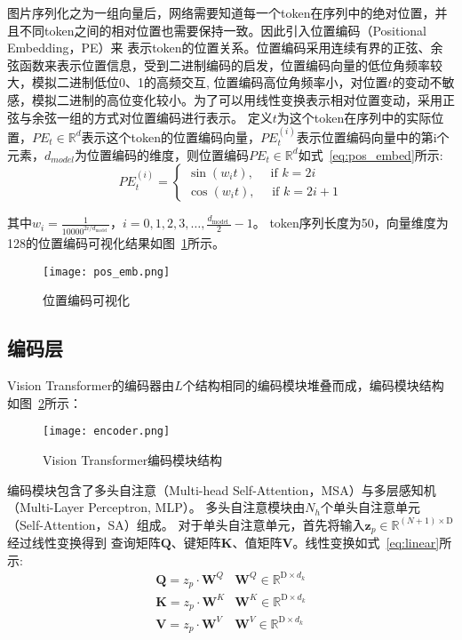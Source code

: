 图片序列化之为一组向量后，网络需要知道每一个token在序列中的绝对位置，并且不同token之间的相对位置也需要保持一致。因此引入位置编码（Positional Embedding，PE）来
表示token的位置关系。位置编码采用连续有界的正弦、余弦函数来表示位置信息，受到二进制编码的启发，位置编码向量的低位角频率较大，模拟二进制低位0、1的高频交互,
位置编码高位角频率小，对位置$t$的变动不敏感，模拟二进制的高位变化较小。为了可以用线性变换表示相对位置变动，采用正弦与余弦一组的方式对位置编码进行表示。
定义$t$为这个token在序列中的实际位置，$P E_{t} \in \mathbb{R}^{d}$表示这个token的位置编码向量，$P E_{t}^{(i)}$表示位置编码向量中的第i个
元素，$d_{model}$为位置编码的维度，则位置编码$P E_{t} \in \mathbb{R}^{d}$如式~\ref{eq:pos_embed}所示:
\begin{equation}
  P E_{t}^{(i)}=\left\{\begin{array}{l}
  \sin \left(w_{i} t\right), \quad \text { if } k=2 i \\
  \cos \left(w_{i} t\right), \quad \text { if } k=2 i+1
  \end{array}\right.
  \label{eq:pos_embed}
\end{equation}

其中$w_{i}=\frac{1}{10000^{2 i / d_{\text {model }}}}$，$i=0,1,2,3, \ldots, \frac{d_{\text {model }}}{2}-1$。
token序列长度为50，向量维度为128的位置编码可视化结果如图~\ref{fig:pos_embed}所示。
\begin{figure}[htbp] 
   \centering   
   \texttt{[image: pos\_emb.png]}   
   \caption{位置编码可视化}   
   \label{fig:pos_embed} 
\end{figure}  

\subsection{编码层}
Vision Transformer的编码器由$L$个结构相同的编码模块堆叠而成，编码模块结构如图~\ref{fig:encoder}所示：
\begin{figure}[htbp] 
   \centering   
   \texttt{[image: encoder.png]}   
   \caption{Vision Transformer编码模块结构}   
   \label{fig:encoder} 
\end{figure}  

编码模块包含了多头自注意（Multi-head Self-Attention，MSA）与多层感知机（Multi-Layer Perceptron, MLP）。
多头自注意模块由$N_h$个单头自注意单元（Self-Attention，SA）组成。
对于单头自注意单元，首先将输入$\mathbf{z}_{p} \in \mathbb{R}^{(N+1) \times \mathrm{D}}$经过线性变换得到
查询矩阵$\boldsymbol{Q}$、键矩阵$\boldsymbol{K}$、值矩阵$\boldsymbol{V}$。线性变换如式~\ref{eq:linear}所示:
\begin{equation}
  \begin{array}{ll}
  \boldsymbol{Q}=z_{p} \cdot \boldsymbol{W}^{Q} & \boldsymbol{W}^{Q} \in \mathbb{R}^{\mathrm{D} \times d_{k}} \\
  \boldsymbol{K}=z_{p} \cdot \boldsymbol{W}^{K} & \boldsymbol{W}^{K} \in \mathbb{R}^{\mathrm{D} \times d_{k}} \\
  \boldsymbol{V}=z_{p} \cdot \boldsymbol{W}^{V} & \boldsymbol{W}^{V} \in \mathbb{R}^{\mathrm{D} \times d_{k}}
  \end{array}
  \label{eq:linear}
\end{equation}

